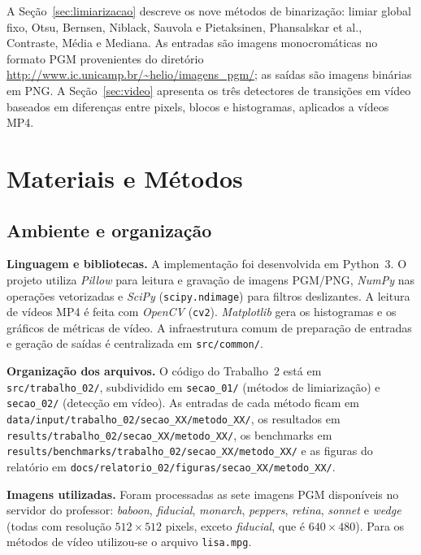 \documentclass[12pt,a4paper]{article}
\newcommand{\arquivo}[1]{\nolinkurl{#1}}
\newcommand{\campo}[2]{\textbf{#1.} #2\par}
\begin{document}
A Seção~\ref{sec:limiarizacao} descreve os nove métodos de binarização: limiar global fixo,
Otsu, Bernsen, Niblack, Sauvola e Pietaksinen, Phansalskar et al., Contraste, Média e
Mediana. As entradas são imagens monocromáticas no formato PGM provenientes do diretório
\url{http://www.ic.unicamp.br/~helio/imagens_pgm/}; as saídas são imagens binárias em PNG.
A Seção~\ref{sec:video} apresenta os três detectores de transições em vídeo baseados em
diferenças entre pixels, blocos e histogramas, aplicados a vídeos MP4.

\section{Materiais e Métodos}

\subsection{Ambiente e organização}

\campo{Linguagem e bibliotecas}{A implementação foi desenvolvida em Python~3. O projeto
utiliza \textit{Pillow} para leitura e gravação de imagens PGM/PNG, \textit{NumPy} nas
operações vetorizadas e \textit{SciPy} (\texttt{scipy.ndimage}) para filtros deslizantes.
A leitura de vídeos MP4 é feita com \textit{OpenCV} (\texttt{cv2}).
\textit{Matplotlib} gera os histogramas e os gráficos de métricas de vídeo.
A infraestrutura comum de preparação de entradas e geração de saídas é centralizada em
\arquivo{src/common/}.}

\campo{Organização dos arquivos}{O código do Trabalho~2 está em
\arquivo{src/trabalho\_02/}, subdividido em \arquivo{secao\_01/} (métodos de limiarização)
e \arquivo{secao\_02/} (detecção em vídeo). As entradas de cada método ficam em
\arquivo{data/input/trabalho\_02/secao\_XX/metodo\_XX/}, os resultados em
\arquivo{results/trabalho\_02/secao\_XX/metodo\_XX/},
os benchmarks em \arquivo{results/benchmarks/trabalho\_02/secao\_XX/metodo\_XX/} e as figuras
do relatório em \arquivo{docs/relatorio\_02/figuras/secao\_XX/metodo\_XX/}.}

\campo{Imagens utilizadas}{Foram processadas as sete imagens PGM disponíveis no servidor do
professor: \textit{baboon}, \textit{fiducial}, \textit{monarch}, \textit{peppers},
\textit{retina}, \textit{sonnet} e \textit{wedge} (todas com resolução $512\times 512$ pixels,
exceto \textit{fiducial}, que é $640\times 480$). Para os métodos de vídeo utilizou-se o
arquivo \texttt{lisa.mpg}.}
\end{document}
